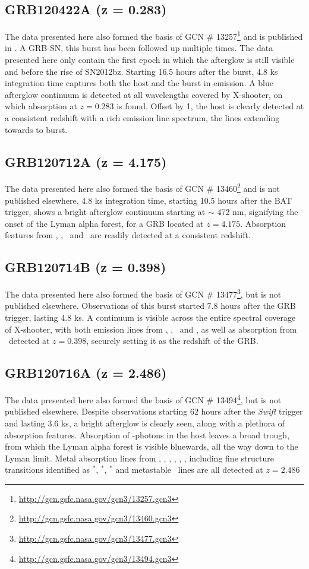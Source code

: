 \documentclass{aa}    %
\begin{document}
\subsection{GRB120422A (z = 0.283)}
The data presented here also formed the basis of GCN \#
13257\footnote{\url{http://gcn.gsfc.nasa.gov/gcn3/13257.gcn3}} and is published
in \citet{Schulze2014}. A GRB-SN, this burst has been followed up multiple
times. The data presented here only contain the first epoch in which the
afterglow is still visible and before the rise of SN2012bz. Starting 16.5 hours
after the burst, 4.8 ks integration time captures both the host and the burst
in emission. A blue afterglow continuum is detected at all wavelengths covered
by X-shooter, on which \mgii absorption at $z = 0.283$ is found. Offset by
1, the host is clearly detected at a consistent redshift with a rich
emission line spectrum, the lines extending towards to burst.

\subsection{GRB120712A (z = 4.175)}
The data presented here also formed the basis of GCN \#
13460\footnote{\url{http://gcn.gsfc.nasa.gov/gcn3/13460.gcn3}} and is not
published elsewhere. 4.8 ks integration time, starting 10.5 hours after the BAT
trigger, shows a bright afterglow continuum starting at $\sim$ 472 nm,
signifying the onset of the Lyman alpha forest, for a GRB located at $z =
4.175$. Absorption features from \lya, \feii, \mgii~and \SIii~are readily
detected at a consistent redshift.

\subsection{GRB120714B (z = 0.398)}
The data presented here also formed the basis of GCN \#
13477\footnote{\url{http://gcn.gsfc.nasa.gov/gcn3/13477.gcn3}}, but is not
published elsewhere. Observations of this burst started 7.8 hours after the GRB
trigger, lasting 4.8 ks. A continuum is visible across the entire spectral
coverage of X-shooter, with both emission lines from  \oii, \hb, \oiii~and \ha,
as well as absorption from \mgii~detected at $z = 0.398$, securely setting it
as the redshift of the GRB.


\subsection{GRB120716A (z = 2.486)}
The data presented here also formed the basis of GCN \#
13494\footnote{\url{http://gcn.gsfc.nasa.gov/gcn3/13494.gcn3}}, but is not
published elsewhere. Despite observations starting 62 hours after the
\textit{Swift} trigger and lasting 3.6 ks, a bright afterglow is clearly seen,
along with a plethora of absorption features. Absorption of \lya-photons in the
host leaves a broad trough, from which the Lyman alpha forest is visible
bluewards, all the way down to the Lyman limit. Metal absorption lines from
\cii, \SIii, \oi, \feii, \civ, \SIiv, including fine structure transitions
identified as \cii$^*$, \SIii$^*$, \feii$^*$ and metastable \NIii~lines are all
detected at $z = 2.486$
\end{document}

